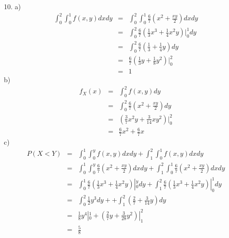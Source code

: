 \documentclass[12pt]{article}
\begin{document}
10.
a)
\begin{eqnarray*}
  \int_{0}^{2} \int_{0}^{1} f(x,y) dx dy
  &=& \int_{0}^{2} \int_{0}^{1} \frac {6}{7} (x^2 + \frac {xy}{2}) dx dy \\
  &=& \int_{0}^{2} \frac {6}{7} 
  (\frac{1}{3} x^3 + \frac {1}{4} x^2y)|_0^1 dy \\
  &=& \int_{0}^{2} \frac {6}{7} (\frac{1}{3} + \frac {1}{4} y) dy \\
  &=& \frac {6}{7} (\frac{1}{3} y + \frac {1}{8} y^2)|_0^2 \\
  &=& 1
\end{eqnarray*}
b)
\begin{eqnarray*}
  f_X(x)
  &=& \int_{0}^{2} f(x,y) dy \\
  &=& \int_{0}^{2} \frac {6}{7} (x^2 + \frac {xy}{2}) dy \\
  &=& (\frac {3}{7} x^2y + \frac {3}{14} xy^2)|_0^2 \\
  &=& \frac {6}{7} x^2 + \frac {6}{7} x
\end{eqnarray*}
c)
\begin{eqnarray*}
P(X < Y)
&=& \int_{0}^{1} \int_{0}^{y} f(x,y) dx dy 
+ \int_{1}^{2} \int_{0}^{1} f(x,y) dx dy \\
&=& \int_{0}^{1} \int_{0}^{y} \frac {6}{7} (x^2 + \frac {xy}{2}) dx dy
+  \int_{1}^{2} \int_{0}^{1} \frac {6}{7} (x^2 + \frac {xy}{2}) dx dy \\
&=& \int_{0}^{1} \frac {6}{7} (\frac{1}{3} x^3 + \frac {1}{4} x^2y)|_0^y dy
+ \int_{1}^{2} \frac{6}{7} (\frac{1}{3} x^3 + \frac {1}{4} x^2y)|_0^1 dy \\
&=& \int_{0}^{2} \frac{1}{2} y^3 dy + 
+ \int_{1}^{2} (\frac{2}{7} + \frac {3}{14} y) dy \\
&=& \frac{1}{8} y^4|_0^1 + (\frac{2}{7} y + \frac {3}{28} y^2)|_1^2 \\
&=& \frac {5}{8}
\end{eqnarray*}
\end{document}
